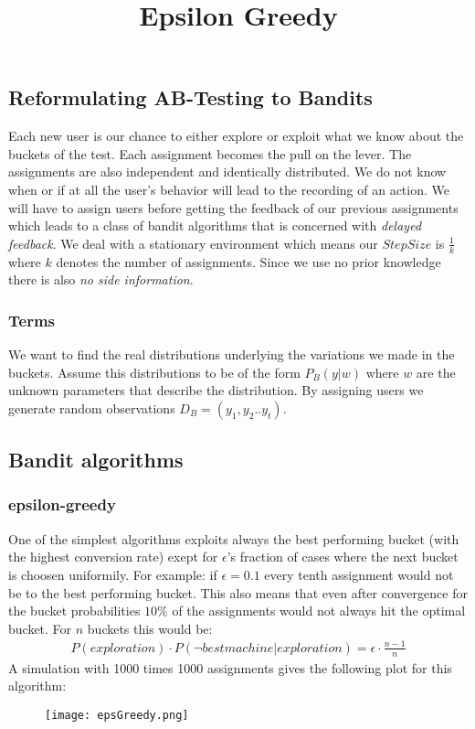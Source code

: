 \documentclass[main.tex]{subfiles}
\begin{document}
\subsection{Reformulating AB-Testing to Bandits}
Each new user is our chance to either explore or exploit what we know about the buckets of the test. Each assignment becomes the pull on the lever. The assignments are also independent and identically distributed. We do not know when or if at all the user's behavior will lead to the recording of an action. We will have to assign users before getting the feedback of our previous assignments which leads to a class of bandit algorithms that is concerned with \emph{delayed feedback}. We deal with a stationary environment which means our $StepSize$ is $\frac{1}{k}$ where $k$ denotes the number of assignments. Since we use no prior knowledge there is also \emph{no side information}. 
\subsubsection{Terms}
We want to find the real distributions underlying the variations we made in the buckets. Assume this distributions to be of the form $P_B(y|w)$ where $w$ are the unknown parameters that describe the distribution. By assigning users we generate random observations $D_B=(y_1,y_2..y_t)$.

\subsection{Bandit algorithms}
\subsubsection{epsilon-greedy}
One of the simplest algorithms exploits always the best performing bucket (with the highest conversion rate) exept for $\epsilon $'s fraction of cases where the next bucket is choosen uniformily. For example: if $\epsilon = 0.1$ every tenth assignment would not be to the best performing bucket. This also means that even after convergence for the bucket probabilities $10\%$ of the assignments would not always hit the optimal bucket. For $n$ buckets this would be:
\begin{align*}
P(exploration) \cdot P(\neg best machine | exploration) = \epsilon \cdot \frac{n-1}{n}
\end{align*}
A simulation with 1000 times 1000 assignments gives the following plot for this algorithm:
\begin{figure}[ht]
\texttt{[image: epsGreedy.png]}
\centering
\title{Epsilon Greedy}
\end{figure}
\end{document}
